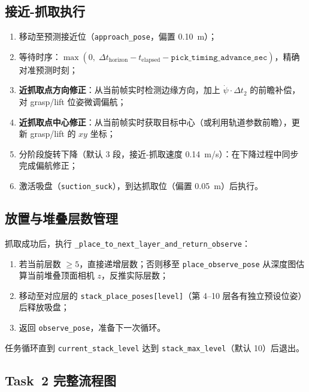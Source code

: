 \documentclass[12pt,a4paper]{article}
\begin{document}
\subsection{接近-抓取执行}

\begin{enumerate}[noitemsep]
  \item 移动至预测接近位（\texttt{approach\_pose}，偏置 0.10~m）；
  \item 等待时序：$\max(0,\; \Delta t_\mathrm{horizon} - t_\mathrm{elapsed} - \texttt{pick\_timing\_advance\_sec})$，精确对准预测时刻；
  \item \textbf{近抓取点方向修正}：从当前帧实时检测边缘方向，加上 $\dot\psi \cdot \Delta t_2$ 的前瞻补偿，对 grasp/lift 位姿微调偏航；
  \item \textbf{近抓取点中心修正}：从当前帧实时获取目标中心（或利用轨道参数前瞻），更新 grasp/lift 的 $xy$ 坐标；
  \item 分阶段旋转下降（默认 3 段，接近-抓取速度 0.14~m/s）：在下降过程中同步完成偏航修正；
  \item 激活吸盘（\texttt{suction\_suck}），到达抓取位（偏置 0.05~m）后执行。
\end{enumerate}

\subsection{放置与堆叠层数管理}

抓取成功后，执行 \texttt{\_place\_to\_next\_layer\_and\_return\_observe}：
\begin{enumerate}[noitemsep]
  \item 若当前层数 $\geq 5$，直接递增层数；否则移至 \texttt{place\_observe\_pose} 从深度图估算当前堆叠顶面相机 $z$，反推实际层数；
  \item 移动至对应层的 \texttt{stack\_place\_poses[level]}（第 4--10 层各有独立预设位姿）后释放吸盘；
  \item 返回 \texttt{observe\_pose}，准备下一次循环。
\end{enumerate}
任务循环直到 \texttt{current\_stack\_level} 达到 \texttt{stack\_max\_level}（默认 10）后退出。

\subsection{Task~2 完整流程图}
\end{document}
